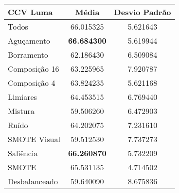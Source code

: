 
\begin{table}[!htbp]
\centering
\caption{}
\label{tab:resultados:x:melhor}
\begin{tabular}{|l|c|c|}
\hline
\textbf{CCV Luma} & \textbf{Média}     & \textbf{Desvio Padrão} \\ \hline

   Todos        & 66.015325 & 5.621643  \\ \hline
  Aguçamento    & \textbf{66.684300} & 5.619944  \\ \hline
  Borramento    & 62.186430 & 6.509084  \\ \hline
  Composição 16 & 63.225965 & 7.920787  \\ \hline
  Composição 4  & 63.824235 & 5.621168  \\ \hline
  Limiares      & 64.453515 & 6.769440  \\ \hline
  Mistura       & 59.506260 & 6.472903  \\ \hline
  Ruído         & 64.202075 & 7.231610  \\ \hline
  SMOTE Visual  & 59.512530 & 7.737273  \\ \hline
  Saliência     & \textbf{66.260870} & 5.732209  \\ \hline
 SMOTE          & 65.531135 & 4.714502  \\ \hline
Desbalanceado   & 59.640090 & 8.675836  \\ \hline

\end{tabular}
\end{table}

